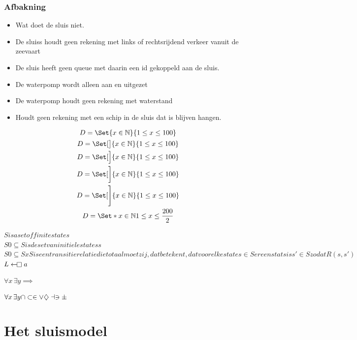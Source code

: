  



 
 


\subsection{Afbakning}
\begin{itemize}
	\item Wat doet de sluis niet.
	\item De sluiss houdt geen rekening met links of rechtsrijdend verkeer vanuit de zeevaart
	\item De sluis heeft geen queue met daarin een id gekoppeld aan de sluis.
	\item De waterpomp wordt alleen aan en uitgezet
	\item De waterpomp houdt geen rekening met waterstand
	\item Houdt geen rekening met een schip in de sluis dat is blijven hangen.
	
\end{itemize}


\begin{center}
	\begin{gather*}
		D=\Set{x\in\nat}{1\le x\le 100}\\
		D=\Set[\big]{x\in\nat}{1\le x\le 100}\\
		D=\Set[\Big]{x\in\nat}{1\le x\le 100}\\
		D=\Set[\bigg]{x\in\nat}{1\le x\le 100}\\
		D=\Set[\Bigg]{x\in\nat}{1\le x\le 100}\\
		D=\Set*{x\in\nat}{1\le x\le \frac{200}{2}}
	\end{gather*}
\end{center}





$S is a set of finite states$\\
$S0 \subseteq S is de set van initiele statess$ \\
$S0 \subseteq S xS  is een transitie relatie die totaal moet zij, dat betekent, dat voor elke state s \in S er een stats is s' \in S zodat R(s,s')$
$L\gets\mathrel{\mkern-2.4mu\mathop\square} a$

$\forall x\,\exists y \implies $

$\forall x\,\exists y \cap \subset \in \vee \diamondsuit \dashv \ni \pm$

 
\chapter{Het sluismodel}

